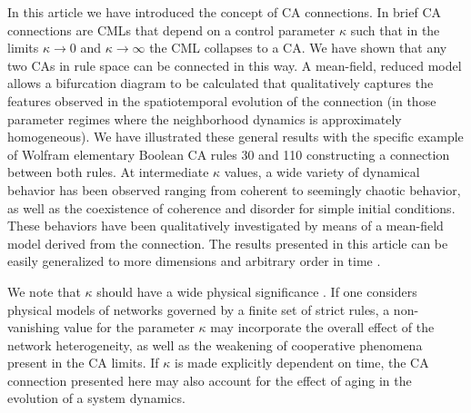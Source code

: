 \documentclass[aps,pre,preprint,floatfix]{revtex4}
\theoremstyle{plain} \newtheorem{defi}{Definition}[section]
\theoremstyle{plain} \newtheorem{prop}{Proposition}[section]
\theoremstyle{plain} \newtheorem{theor}{Theorem}[section]
\theoremstyle{plain} \newtheorem{lemma}{Lemma}[section]
\theoremstyle{plain} \newtheorem*{corol}{Corollary}
\theoremstyle{remark} \newtheorem*{rem}{Remark}
\theoremstyle{plain} \newtheorem{exer}{Exercise}[section]
\theoremstyle{remark} \newtheorem*{ans}{Answer}
\begin{document}
In this article we have introduced the concept of CA connections. In brief CA connections are CMLs that depend on a control parameter $\kappa$ such that in the limits $\kappa \to 0$ and $\kappa \to \infty$ the CML collapses to a CA. We have shown that any two CAs in rule space can be connected in this way. A mean-field, reduced model allows a bifurcation diagram to be calculated that qualitatively captures the features observed in the spatiotemporal evolution of the connection (in those parameter regimes where the neighborhood dynamics is approximately homogeneous). We have illustrated these general results with the specific example of Wolfram elementary Boolean CA rules 30 and 110 \cite{Wolfram} constructing a connection between both rules. At intermediate $\kappa$ values, a wide variety of dynamical behavior has been observed ranging from coherent to seemingly chaotic behavior, as well as the coexistence of coherence and disorder for simple initial conditions. These behaviors have been qualitatively investigated by means of a mean-field model derived from the connection. The results presented in this article can be easily generalized to more dimensions and arbitrary order in time \cite{VGM1}.

We note that $\kappa$ should have a wide physical significance \cite{VGMSMJA}. If one considers physical models of networks governed by a finite set of strict rules, a non-vanishing value for the parameter $\kappa$ may incorporate the overall effect of the network heterogeneity, as well as the weakening of  cooperative phenomena present in the CA limits. If $\kappa$ is made explicitly dependent on time, the CA connection presented here may also account for the effect of aging in the evolution of a system dynamics.




\end{document}
